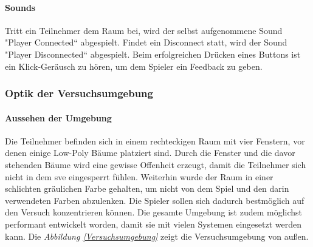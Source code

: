 \documentclass[a4paper,11pt]{article}%
\renewcommand{\\}{\vspace*{0.5\baselineskip} \newline}
\begin{document}
\paragraph{Sounds}
Tritt ein Teilnehmer dem Raum bei, wird der selbst aufgenommene Sound "Player
Connected“ abgespielt. Findet ein Disconnect statt, wird der Sound "Player
Disconnected“ abgespielt. Beim erfolgreichen Drücken eines Buttons ist ein Klick-Geräusch zu hören, um dem Spieler ein Feedback zu geben. 

\newpage	
\subsubsection{Optik der Versuchsumgebung}
\paragraph{Aussehen der Umgebung}
Die Teilnehmer befinden sich in einem rechteckigen Raum mit vier Fenstern, vor denen einige Low-Poly Bäume platziert sind. Durch die Fenster und die davor stehenden Bäume wird eine gewisse Offenheit erzeugt, damit die Teilnehmer sich nicht in dem \ac{sve} eingesperrt fühlen. Weiterhin wurde der Raum in einer schlichten gräulichen Farbe gehalten, um nicht von dem Spiel und den darin verwendeten Farben abzulenken. Die Spieler sollen sich dadurch bestmöglich auf den Versuch konzentrieren können. Die gesamte Umgebung ist zudem möglichst performant entwickelt worden, damit sie mit vielen Systemen eingesetzt werden kann. Die \textit{Abbildung \ref{Versuchsumgebung}} zeigt die Versuchsumgebung von außen.
\end{document}
